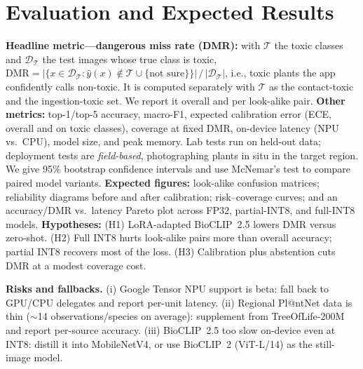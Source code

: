 \documentclass[conference,10pt]{IEEEtran}
\begin{document}
\section{Evaluation and Expected Results}
\textbf{Headline metric---dangerous miss rate (DMR):} with $\mathcal{T}$
the toxic classes and $\mathcal{D}_\mathcal{T}$ the test images whose true class is toxic,
$\mathrm{DMR}=|\{x\in\mathcal{D}_\mathcal{T}:\hat{y}(x)\notin\mathcal{T}\cup\{\text{not sure}\}\}|\,/\,|\mathcal{D}_\mathcal{T}|$,
i.e., toxic plants the app confidently calls non-toxic. It is computed separately with
$\mathcal{T}$ as the contact-toxic and the ingestion-toxic set. We report it overall and per look-alike pair.
\textbf{Other metrics:} top-1/top-5 accuracy, macro-F1, expected calibration error
(ECE, overall and on toxic classes), coverage at fixed DMR, on-device latency
(NPU vs.\ CPU), model size, and peak memory. Lab tests run on held-out data; deployment tests are \emph{field-based}, photographing
plants in situ in the target region. We give 95\% bootstrap confidence
intervals and use McNemar's test to compare paired model variants.
\textbf{Expected figures:} look-alike confusion matrices; reliability diagrams before
and after calibration; risk--coverage curves; and an accuracy/DMR vs.\ latency
Pareto plot across FP32, partial-INT8, and full-INT8 models.
\textbf{Hypotheses:} (H1) LoRA-adapted BioCLIP~2.5 lowers DMR versus zero-shot.
(H2) Full INT8 hurts look-alike pairs more than overall accuracy; partial INT8 recovers
most of the loss. (H3) Calibration plus abstention cuts DMR at a modest coverage cost.

\textbf{Risks and fallbacks.} (i) Google Tensor NPU support is beta: fall back to
GPU/CPU delegates and report per-unit latency. (ii) Regional Pl@ntNet data is thin
($\sim$14 observations/species on average): supplement from TreeOfLife-200M and report
per-source accuracy. (iii) BioCLIP~2.5 too slow on-device even at INT8: distill it
into MobileNetV4, or use BioCLIP~2 (ViT-L/14) as the still-image model.
\end{document}
